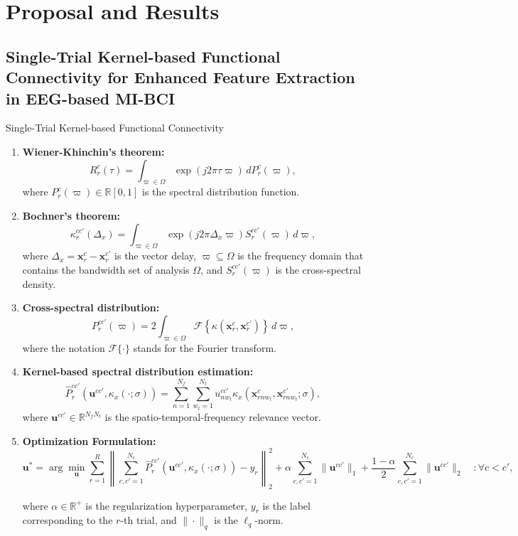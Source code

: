\documentclass[aspectratio=169]{beamer}
\begin{document}
\section{Proposal and Results}

\subsection{Single-Trial Kernel-based Functional Connectivity for Enhanced Feature Extraction in EEG-based MI-BCI}

\begin{frame}[allowframebreaks]{Single-Trial Kernel-based Functional Connectivity}
    \begin{enumerate}
        \item \textbf{Wiener-Khinchin's theorem:} 
        \[
        R^{c}_{r}(\tau) = \int_{\varpi \in \Omega} \exp(j2\pi \tau \varpi) \, dP^{c}_{r}(\varpi),
        \]
        where $P^{c}_{r}(\varpi) \in \mathbb{R}[0,1]$ is the spectral distribution function.
        
        \item \textbf{Bochner's theorem:} 
        \[
        \kappa^{cc'}_{r}(\Delta_{x}) = \int_{\varpi \in \Omega} \exp(j2\pi \Delta_{x} \varpi) S^{cc'}_{r}(\varpi) \, d\varpi,
        \]
        where $\Delta_{x} = \mathbf{x}^{c}_{r} - \mathbf{x}^{c'}_{r}$ is the vector delay, $\varpi \subseteq \varOmega$ is the frequency domain that contains the bandwidth set of analysis $\varOmega$, and $S^{cc'}_{r}(\varpi)$ is the cross-spectral density.

        \item \textbf{Cross-spectral distribution:} 
        \[
        P^{cc'}_{r}(\varpi) = 2 \int_{\varpi \in \varOmega} \mathscr{F}\left\{\kappa(\mathbf{x}^{c}_{r}, \mathbf{x}^{c'}_{r}) \right\} \, d\varpi,
        \]
        where the notation $\mathscr{F}\{\cdot\}$ stands for the Fourier transform.

        \item \textbf{Kernel-based spectral distribution estimation:}
        \[
        \hat{P}^{cc'}_{r}(\mathbf{u}^{cc'},\kappa_x\left(\cdot;\sigma\right)) = \sum_{n=1}^{N_f}\sum_{w_t=1}^{N_t} u_{nw_t}^{cc'}\kappa_x\left(\mathbf{x}^{c}_{rnw_t},\mathbf{x}^{c'}_{rnw_t};\sigma\right),
        \]
        where $\mathbf{u}^{cc'} \in \mathbb{R}^{N_f N_t}$ is the spatio-temporal-frequency relevance vector.

        \item \textbf{Optimization Formulation:}
        {\scriptsize
        \[
        \mathbf{u}^* = \arg \min_{\mathbf{u}} \sum_{r=1}^{R} \left\|\sum_{c,c'=1}^{N_c}\hat{P}^{cc'}_{r}(\mathbf{u}^{cc'},\kappa_x(\cdot;\sigma))-y_r\right\|^2_2 + \alpha \sum_{c,c'=1}^{N_c}\|\mathbf{u}^{cc'}\|_1 + \frac{1-\alpha}{2} \sum_{c,c'=1}^{N_c}\|\mathbf{u}^{cc'}\|_2 \quad :  \forall c < c',
        \]}

        where $\alpha \in \mathbb{R}^+$ is the regularization hyperparameter, $y_r$ is the label corresponding to the $r$-th trial, and $\| \cdot \|_q$ is the $\ell_q$-norm.
    \end{enumerate}
\end{frame}
\end{document}
